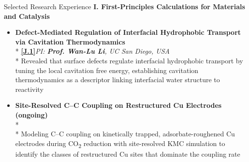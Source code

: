 \documentclass{resume} %
\begin{document}
\clearpage
\begin{rSection}{Selected Research Experience}
\textbf{I. First-Principles Calculations for Materials and Catalysis}\par
\begin{itemize}[itemsep=6pt]
  \item \textbf{Defect-Mediated Regulation of Interfacial Hydrophobic Transport via Cavitation Thermodynamics} \\* {\small\hyperlink{J.1}{\textbf{[J.1]}}}\hfill{\small\textit{PI: \textbf{Prof. Wan-Lu Li}, UC San Diego, USA}} \\* Revealed that surface defects regulate interfacial hydrophobic transport by tuning the local cavitation free energy, establishing cavitation thermodynamics as a descriptor linking interfacial water structure to reactivity
  \item \textbf{Site-Resolved C--C Coupling on Restructured Cu Electrodes (ongoing)} \\*  \\* Modeling C--C coupling on kinetically trapped, adsorbate-roughened Cu electrodes during CO\textsubscript{2} reduction with site-resolved KMC simulation to identify the classes of restructured Cu sites that dominate the coupling rate

\end{itemize}
\end{rSection}
\end{document}
